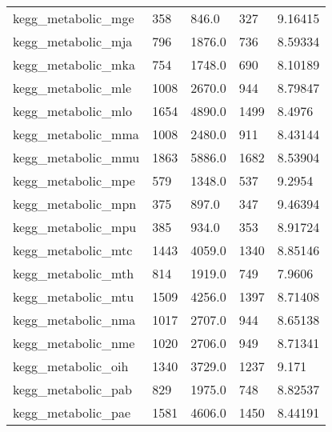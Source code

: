\begin{longtable}{lllll}
 kegg\_metabolic\_mge                                 & 358        & 846.0       & 327   & 9.16415    \\
 kegg\_metabolic\_mja                                 & 796        & 1876.0      & 736   & 8.59334    \\
 kegg\_metabolic\_mka                                 & 754        & 1748.0      & 690   & 8.10189    \\
 kegg\_metabolic\_mle                                 & 1008       & 2670.0      & 944   & 8.79847    \\
 kegg\_metabolic\_mlo                                 & 1654       & 4890.0      & 1499  & 8.4976     \\
 kegg\_metabolic\_mma                                 & 1008       & 2480.0      & 911   & 8.43144    \\
 kegg\_metabolic\_mmu                                 & 1863       & 5886.0      & 1682  & 8.53904    \\
 kegg\_metabolic\_mpe                                 & 579        & 1348.0      & 537   & 9.2954     \\
 kegg\_metabolic\_mpn                                 & 375        & 897.0       & 347   & 9.46394    \\
 kegg\_metabolic\_mpu                                 & 385        & 934.0       & 353   & 8.91724    \\
 kegg\_metabolic\_mtc                                 & 1443       & 4059.0      & 1340  & 8.85146    \\
 kegg\_metabolic\_mth                                 & 814        & 1919.0      & 749   & 7.9606     \\
 kegg\_metabolic\_mtu                                 & 1509       & 4256.0      & 1397  & 8.71408    \\
 kegg\_metabolic\_nma                                 & 1017       & 2707.0      & 944   & 8.65138    \\
 kegg\_metabolic\_nme                                 & 1020       & 2706.0      & 949   & 8.71341    \\
 kegg\_metabolic\_oih                                 & 1340       & 3729.0      & 1237  & 9.171      \\
 kegg\_metabolic\_pab                                 & 829        & 1975.0      & 748   & 8.82537    \\
 kegg\_metabolic\_pae                                 & 1581       & 4606.0      & 1450  & 8.44191    \\

\end{longtable}
